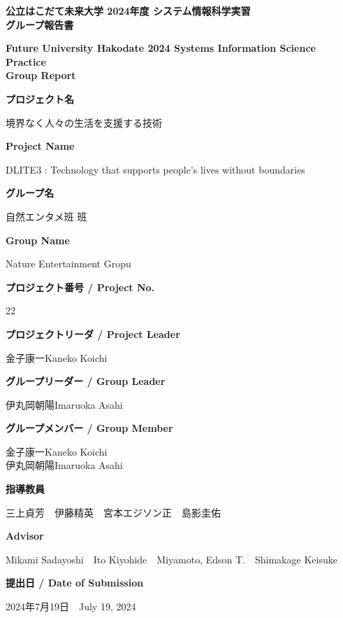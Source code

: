 \documentclass[12pt,a4paper]{report}
\newcommand{\AgendaBox}[2]{
    \large
    \textbf{#1}\\

    \vspace{0.2cm}

    \small 
    #2

    \vspace{0.5cm}
}
\newcommand{\NameBox}[2]{
    \small 
    #1\hspace{1cm}#2
}
\begin{document}
\thispagestyle{empty}
\begin{center}
    \large
    \textbf{
      公立はこだて未来大学 2024年度 システム情報科学実習\\
      グループ報告書
    }\\

    \vspace{0.2cm}

    \small 
    \textbf{
      Future University Hakodate 2024 Systems Information Science Practice\\Group Report
    }

    \vspace{0.5cm}

    \AgendaBox{プロジェクト名}{境界なく人々の生活を支援する技術}
    \AgendaBox{Project Name}{DLITE3 : Technology that supports people's lives without boundaries}
    \AgendaBox{グループ名}{自然エンタメ班 班}
    \AgendaBox{Group Name}{Nature Entertainment Gropu}
    \AgendaBox{プロジェクト番号 / Project No.}{22}
    \AgendaBox{プロジェクトリーダ / Project Leader}{金子康一\hspace{1cm}Kaneko Koichi}
    \AgendaBox{グループリーダー / Group Leader}{
      \NameBox{伊丸岡朝陽}{Imaruoka Asahi}\\
    }
    \AgendaBox{グループメンバー / Group Member}{
      \NameBox{金子康一}{Kaneko Koichi}\\
      \NameBox{伊丸岡朝陽}{Imaruoka Asahi}\\
    }
    \AgendaBox{指導教員}{
      三上貞芳　伊藤精英　宮本エジソン正　島影圭佑
    }
    \AgendaBox{Advisor}{
      Mikami Sadayoshi　Ito Kiyohide　Miyamoto, Edson T.　Shimakage Keisuke
    }
    \AgendaBox{提出日 / Date of Submission}{
      2024年7月19日　July 19, 2024
    }
    

\end{center}

\newpage
\thispagestyle{empty}
\mbox{}
\newpage

\clearpage
{}
\setcounter{page}{1}
\end{document}
